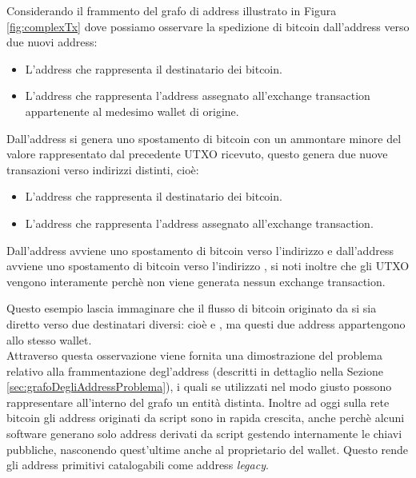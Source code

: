 \begin{example} \label{ex:complexTx}
  Considerando il frammento del grafo di address illustrato in Figura \ref{fig:complexTx} dove possiamo osservare la spedizione di bitcoin dall'address  verso due nuovi address:

  \begin{itemize}
    \item L'address  che rappresenta il destinatario dei bitcoin.
    \item L'address  che rappresenta l'address assegnato all'exchange transaction appartenente al medesimo wallet di origine.
  \end{itemize}
  Dall'address  si genera uno spostamento di bitcoin con un ammontare minore del valore rappresentato dal precedente UTXO ricevuto, questo genera due nuove transazioni verso indirizzi distinti, cioè:
  \begin{itemize}
    \item L'address  che rappresenta il destinatario dei bitcoin.
    \item L'address  che rappresenta l'address assegnato all'exchange transaction.
  \end{itemize}

  Dall'address  avviene uno spostamento di bitcoin verso l'indirizzo  e dall'address  avviene uno spostamento di bitcoin verso l'indirizzo , si noti inoltre che gli UTXO vengono  interamente perchè non viene generata nessun exchange transaction.

  Questo esempio lascia immaginare che il flusso di bitcoin originato da  si sia diretto verso due destinatari diversi: cioè  e , ma questi due address appartengono allo stesso wallet.\\
  Attraverso questa osservazione viene fornita una dimostrazione del problema relativo alla frammentazione degl'address (descritti in dettaglio nella Sezione \ref{sec:grafoDegliAddressProblema}), i quali se utilizzati nel modo giusto possono rappresentare all'interno del grafo un entità distinta.
  Inoltre ad oggi sulla rete bitcoin gli address originati da script sono in rapida crescita, anche perchè alcuni software generano solo address derivati da script gestendo internamente le chiavi pubbliche, nasconendo quest'ultime anche al proprietario del wallet.
  Questo rende gli address primitivi catalogabili come address \emph{legacy}.
\end{example}
